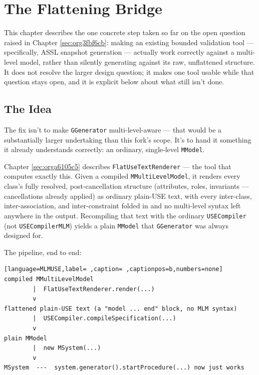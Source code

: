 \documentclass[11pt,twoside,a4paper]{book}
\begin{document}
\chapter{The Flattening Bridge}
\label{sec:orgfee8363}

This chapter describes the one concrete step taken so far on the open
question raised in Chapter \ref{sec:org3fbf6cb}: making an existing
bounded validation tool --- specifically, ASSL snapshot generation ---
actually work correctly against a multi-level model, rather than
silently generating against its raw, unflattened structure. It does
not resolve the larger design question; it makes one tool usable while
that question stays open, and it is explicit below about what still
isn't done.

\section{The Idea}
\label{sec:orge254dcc}
The fix isn't to make \texttt{GGenerator} multi-level-aware --- that would be
a substantially larger undertaking than this fork's scope. It's to
hand it something it already understands correctly: an ordinary,
single-level \texttt{MModel}.

Chapter \ref{sec:orga6105c5} describes
\texttt{FlatUseTextRenderer} --- the tool that computes exactly this. Given a
compiled \texttt{MMultiLevelModel}, it renders every class's fully resolved,
post-cancellation structure (attributes, roles, invariants ---
cancellations already applied) as ordinary plain-USE text, with every
inter-class, inter-association, and inter-constraint folded in and no
multi-level syntax left anywhere in the output. Recompiling that text
with the ordinary \texttt{USECompiler} (not \texttt{USECompilerMLM}) yields a plain
\texttt{MModel} that \texttt{GGenerator} was always designed for.

The pipeline, end to end:

\begin{lstlisting}[language=MLMUSE,label= ,caption= ,captionpos=b,numbers=none]
compiled MMultiLevelModel
        |  FlatUseTextRenderer.render(...)
        v
flattened plain-USE text (a "model ... end" block, no MLM syntax)
        |  USECompiler.compileSpecification(...)
        v
plain MModel
        |  new MSystem(...)
        v
MSystem  ---  system.generator().startProcedure(...) now just works
\end{lstlisting}
\end{document}
